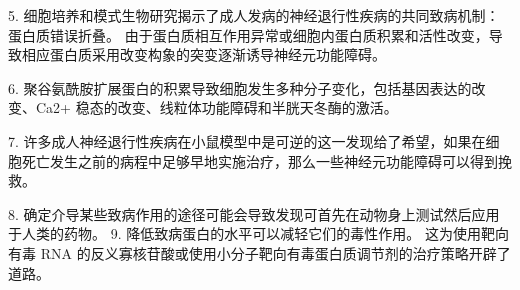 5. 细胞培养和模式生物研究揭示了成人发病的神经退行性疾病的共同致病机制：蛋白质错误折叠。 由于蛋白质相互作用异常或细胞内蛋白质积累和活性改变，导致相应蛋白质采用改变构象的突变逐渐诱导神经元功能障碍。 

6. 聚谷氨酰胺扩展蛋白的积累导致细胞发生多种分子变化，包括基因表达的改变、Ca2+ 稳态的改变、线粒体功能障碍和半胱天冬酶的激活。 

7. 许多成人神经退行性疾病在小鼠模型中是可逆的这一发现给了希望，如果在细胞死亡发生之前的病程中足够早地实施治疗，那么一些神经元功能障碍可以得到挽救。 

8. 确定介导某些致病作用的途径可能会导致发现可首先在动物身上测试然后应用于人类的药物。 9. 降低致病蛋白的水平可以减轻它们的毒性作用。 这为使用靶向有毒 RNA 的反义寡核苷酸或使用小分子靶向有毒蛋白质调节剂的治疗策略开辟了道路。

